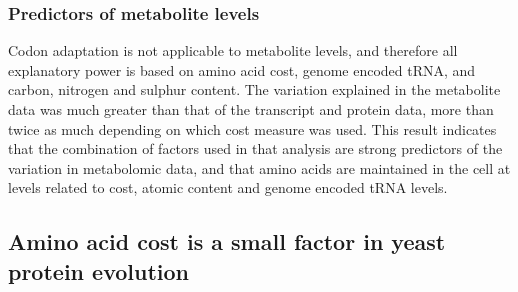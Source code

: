 \subsubsection{Predictors of metabolite levels}

Codon adaptation is not applicable to metabolite levels, and therefore all explanatory power is based on amino acid cost, genome encoded tRNA, and carbon, nitrogen and sulphur content. The variation explained in the metabolite data was much greater than that of the transcript and protein data, more than twice as much depending on which cost measure was used. This result indicates that the combination of factors used in that analysis are strong predictors of the variation in metabolomic data, and that amino acids are maintained in the cell at levels related to cost, atomic content and genome encoded tRNA levels.

\subsection{Amino acid cost is a small factor in yeast protein evolution}
